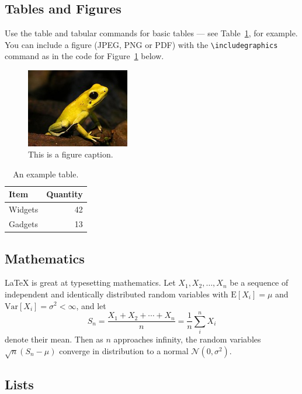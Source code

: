 \documentclass[12pt]{article}
\begin{document}
\subsection{Tables and Figures}

Use the table and tabular commands for basic tables --- see Table~\ref{tab:widgets}, for example. You can include a figure (JPEG, PNG or PDF) with the \verb$\includegraphics$ command as in the code for Figure~\ref{fig:frog} below.

\begin{figure}
\centering
\includegraphics[width=0.4\textwidth]{figures/frog.jpg}
\caption{\label{fig:frog}This is a figure caption.}
\end{figure}

\begin{table}
\centering
\begin{tabular}{l|r}
Item & Quantity \\\hline
Widgets & 42 \\
Gadgets & 13
\end{tabular}
\caption{\label{tab:widgets}An example table.}
\end{table}

\subsection{Mathematics}

\LaTeX{} is great at typesetting mathematics. Let $X_1, X_2, \ldots, X_n$ be a sequence of independent and identically distributed random variables with $\text{E}[X_i] = \mu$ and $\text{Var}[X_i] = \sigma^2 < \infty$, and let
$$S_n = \frac{X_1 + X_2 + \cdots + X_n}{n}
      = \frac{1}{n}\sum_{i}^{n} X_i$$
denote their mean. Then as $n$ approaches infinity, the random variables $\sqrt{n}(S_n - \mu)$ converge in distribution to a normal $\mathcal{N}(0, \sigma^2)$.

\subsection{Lists}
\end{document}
